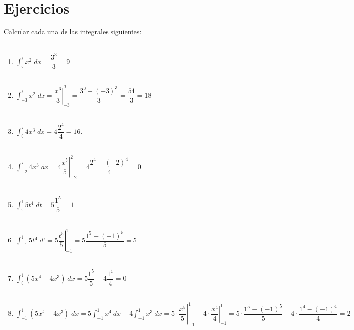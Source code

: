 \section{Ejercicios}
Calcular cada una de las integrales siguientes:\\\\

\begin{enumerate}

    \item $\displaystyle\int_0^3 x^2 \;dx = \dfrac{3^{3}}{3} = 9$\\\\

    \item $\displaystyle\int_{-3}^3 x^2 \; dx = \left.\dfrac{x^3}{3}\right|_{-3}^3 = \dfrac{3^3 - (-3)^3}{3} = \dfrac{54}{3} = 18 $\\\\

    \item $\displaystyle\int_0^2 4x^3 \;dx = 4\dfrac{2^4}{4} = 16$.\\\\

    \item $\displaystyle\int_{-2}^2 4x^3 \; dx = 4 \left.\dfrac{x^5}{5}\right|_{-2}^{2} = 4 \dfrac{2^4 - (-2)^4}{4} = 0$\\\\ 

    \item $\displaystyle\int_0^1 5t^4 \; dt = 5\dfrac{1^5}{5} = 1$\\\\

    \item $\displaystyle\int_{-1}^1 5t^4 \; dt = 5\left.\dfrac{t^5}{5}\right|_{-1}^1 = 5\dfrac{1^5 - (-1)^5}{5} = 5$\\\\

    \item $\displaystyle\int_0^1 (5x^4 - 4x^3) \; dx = 5\dfrac{1^5}{5} - 4\dfrac{1^4}{4} = 0$\\\\

    \item $\displaystyle\int_{-1}^1 (5x^4 - 4x^3) \; dx = 5\int_{-1}^1 x^4 \; dx - 4\int_{-1}^1 x^3 \; dx = 5\cdot \left.\dfrac{x^5}{5}\right|_{-1}^1 - 4\cdot \left.\dfrac{x^4}{4}\right|_{-1}^1 = 5\cdot \dfrac{1^5 - (-1)^5}{5} - 4\cdot \dfrac{1^4 - (-1)^4}{4} = 2$\\\\


\end{enumerate}
